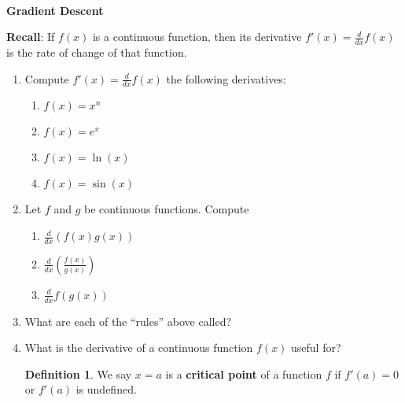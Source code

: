 \documentclass[12pt]{amsart}
\theoremstyle{definition}
\newtheorem*{definition}{Definition}
\begin{document}
	
\thispagestyle{fancy}
\pagestyle{fancy}
	
	\
 
\begin{center}
    {\Large \bf {\sc Gradient Descent}}
\end{center}

\noindent \textbf{Recall}: If $f(x)$ is a continuous function, then its derivative $f'(x)=\frac{d}{dx}f(x)$ is the rate of change of that function.

\begin{enumerate}[itemsep=2.5em,leftmargin=0pt]

\item Compute $f'(x)=\frac{d}{dx}f(x)$ the following derivatives:
\begin{enumerate}
    \item $f(x)=x^n$
    \item $f(x)=e^x$
    \item $f(x)=\ln(x)$
    \item $f(x)=\sin(x)$
\end{enumerate}


\item Let $f$ and $g$ be continuous functions. Compute
\begin{enumerate}
    \item $\displaystyle \frac{d}{dx}\left( f(x)g(x) \right)$
    \item $\displaystyle \frac{d}{dx}\left( \frac{f(x)}{g(x)} \right)$
    \item $\displaystyle \frac{d}{dx} f\left(g(x)\right)$
\end{enumerate}


\item What are each of the ``rules'' above called?


\item\label{ex-deriv} What is the derivative of a continuous function $f(x)$ useful for?

\vspace{2.5em}

\begin{definition}
    We say $x=a$ is a \textbf{critical point} of a function $f$ if $f'(a)=0$ or $f'(a)$ is undefined.
\end{definition}


\end{enumerate}
\end{document}
